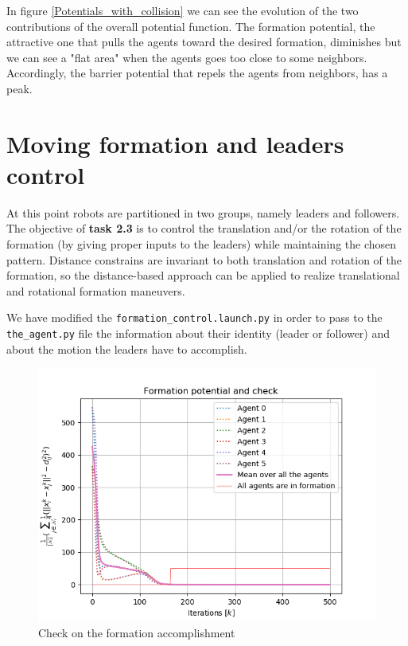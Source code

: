 \documentclass[a4paper,11pt,oneside]{book}
\begin{document}
In figure \ref{Potentials_with_collision} we can see the evolution of the two contributions of the overall potential function. The formation potential, the attractive one that pulls the agents toward the desired formation, diminishes but we can see a "flat area" when the agents goes too close to some neighbors. Accordingly, the barrier potential that repels the agents from neighbors, has a peak.

\section{Moving formation and leaders control}
At this point robots are partitioned in two groups, namely leaders and followers. The objective of \textbf{task 2.3} is to control the translation and/or the rotation of the formation (by giving proper inputs to the leaders) while maintaining the chosen pattern.
Distance constrains  are invariant to both translation and rotation of the formation, so the distance-based approach can be applied to realize translational and rotational formation maneuvers. 

We have modified the \texttt{formation\_control.launch.py} in order to pass to the \texttt{the\_agent.py} file the information about their identity (leader or follower) and about the motion the leaders have to accomplish.

\begin{figure}[h]
\centering
	\includegraphics[scale=0.4]{Task-2.3_Formation-p_Linear-trj_Hexagon}
	\caption{Check on the formation accomplishment}
	\label{Check}
\end{figure}
\end{document}
